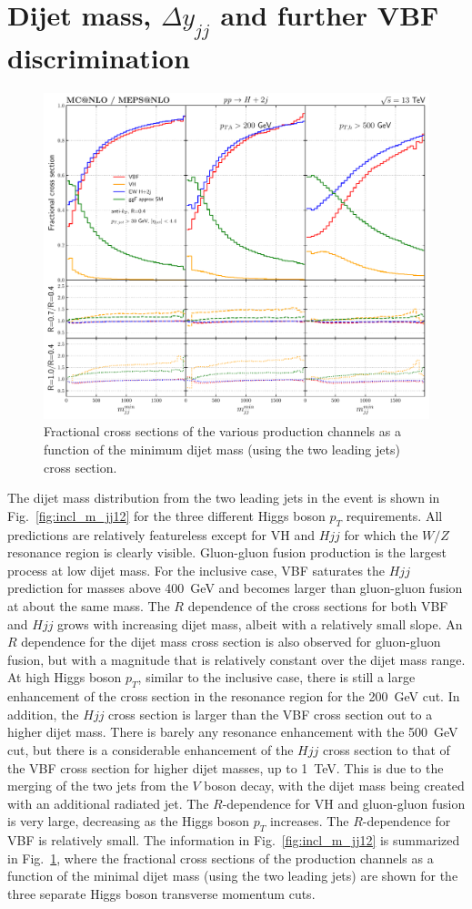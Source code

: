 \documentclass[10pt,prd,fleqn,superscriptaddress,notitlepage,nofootinbib,preprintnumbers,nobalancelastpage]{revtex4-1}
\newcommand{\VBF}{VBF\xspace}
\newcommand{\VH}{VH\xspace}
\begin{document}
\section{Dijet mass, $\Delta y_{jj}$ and further VBF discrimination}
\label{sec:discrimination}

\begin{figure}[p]
  \centering
  \includegraphics[width=.675\textwidth]{figures/vbf/m_jj12.pdf}
  \caption{Fractional cross sections of the various production channels
    as a function of the minimum dijet mass (using the two leading jets) cross section.}
\label{fig:incl_m_jj12_fraction}
\end{figure}
The dijet mass distribution from the two leading jets in the event is shown in Fig.~\ref{fig:incl_m_jj12} for the three different Higgs boson $p_T$ requirements.
All predictions are relatively featureless except for \VH and $Hjj$ for which the $W/Z$ resonance region is clearly visible. Gluon-gluon fusion production is the largest process at low dijet mass.  For the inclusive case, \VBF saturates the $Hjj$ prediction for masses above 400~GeV and becomes larger than gluon-gluon fusion at about the same mass. The $R$ dependence of the cross sections for  both \VBF and $Hjj$
grows with increasing dijet mass, albeit with a relatively small slope. An $R$ dependence for the dijet mass cross section is also observed for gluon-gluon fusion, but with a magnitude that is relatively constant over the dijet mass range. At high Higgs boson $p_T$,  similar to the inclusive case, there is still a large enhancement of the cross section in the resonance region for the 200~GeV cut. In addition,  the $Hjj$ cross section is larger than the \VBF cross section out to a higher dijet mass. There is barely any resonance enhancement with the 500~GeV cut, but there is a considerable enhancement of the $Hjj$ cross section to that of the \VBF cross section for higher  dijet masses, up to  1~TeV. This is due to the merging of the two jets from the $V$ boson decay, with the dijet mass being created with an additional radiated jet. The $R$-dependence for \VH and gluon-gluon fusion is very large, decreasing as the Higgs boson $p_T$ increases. The $R$-dependence for \VBF is relatively small. The information in Fig.~\ref{fig:incl_m_jj12} is summarized in Fig.~\ref{fig:incl_m_jj12_fraction}, where the fractional cross sections of the production channels as a function of the minimal dijet mass (using the two leading jets) are shown for the three separate Higgs boson transverse momentum cuts.
\end{document}

